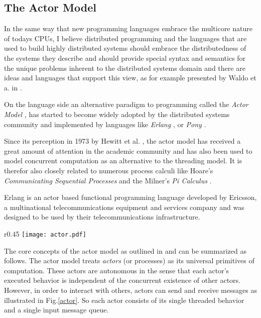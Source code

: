 \subsection{The Actor Model}
\label{actorModel}

In the same way that new programming languages embrace the multicore
nature of todays CPUs, I believe distributed programming
and the languages that are used to build highly distributed
systems should embrace the distributedness of the systems they
describe and should provide special syntax and semantics
for the unique problems inherent to the distributed systems domain
and there are ideas and languages that support this
view, as for example presented by Waldo et a. in \cite{noteondistributed}.
\newline

On the language side an alternative paradigm to programming
called the \textit{Actor Model} \cite{actors73}, \cite{actors2010}
has started to become widely adopted by the distributed systems
community and implemented by languages like
\textit{Erlang} \cite{erlang}, \cite{armstrongerlang} or
\textit{Pony} \cite{pony}.

Since its perception in 1973 by Hewitt et al. \cite{actors73},
the actor model has received a great amount of attention in the
academic community and has also been used to model concurrent
computation as an alternative to the threading model. It is therefor
also closely related to numerous process calculi like Hoare's
\textit{Communicating Sequential Processes} \cite{hoarecsp} and
the Milner's \textit{Pi Calculus} \cite{pimilner}.

Erlang is an actor based functional programming language
developed by Ericsson, a multinational telecommunications equipment
and services company and was designed to be used by their
telecommunications infrastructure.
\newline

\begin{wrapfigure}{r}{0.45\textwidth}
  \texttt{[image: actor.pdf]}
  \caption{Concept of an \textit{Actor} as \\defined by the
          actor model.}
  \label{actor}
\end{wrapfigure}

The core concepts of the actor model as outlined in \cite{actorsagha}
and \cite{actors2010}
can be summarized as follows. The actor model treats \textit{actors}
(or processes) as its universal primitives of computation.
These actors are autonomous in the sense that each actor's executed
behavior is independent of the concurrent existence of other actors.
However, in order to interact with others, actors can send and receive
messages as illustrated in Fig.\ref{actor}. So each actor consists
of its single threaded behavior and a single input message queue.


